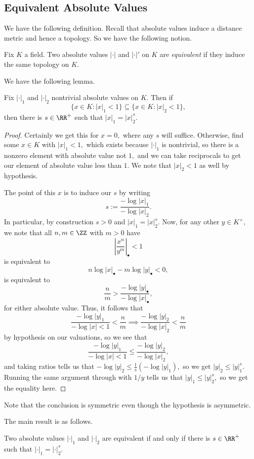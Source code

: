 \documentclass[../notes.tex]{subfiles}
\begin{document}
\subsection{Equivalent Absolute Values}
We have the following definition. Recall that absolute values induce a distance metric and hence a topology. So we have the following notion.
\begin{definition}[Equivalent]
	Fix $K$ a field. Two absolute values $|\cdot|$ and $|\cdot|'$ on $K$ are \textit{equivalent} if they induce the same topology on $K.$
\end{definition}
We have the following lemma.
\begin{lemma} \label{lem:eqabsvals}
	Fix $|\cdot|_1$ and $|\cdot|_2$ nontrivial absolute values on $K.$ Then if
	\[\{x\in K:|x|_1<1\}\subseteq\{x\in K:|x|_2<1\},\]
	then there is $s\in\RR^+$ such that $|x|_1=|x|_2^s.$
\end{lemma}
\begin{proof}
	Certainly we get this for $x=0,$ where any $s$ will suffice. Otherwise, find some $x\in K$ with $|x|_1<1,$ which exists because $|\cdot|_1$ is nontrivial, so there is a nonzero element with absolute value not $1,$ and we can take reciprocals to get our element of absolute value less than $1.$ We note that $|x|_2<1$ as well by hypothesis.

	The point of this $x$ is to induce our $s$ by writing
	\[s:=\frac{-\log|x|_1}{-\log|x|_2}.\]
	In particular, by construction $s>0$ and $|x|_1=|x|_2^s.$ Now, for any other $y\in K^\times,$ we note that all $n,m\in\ZZ$ with $m>0$ have
	\[\left|\frac{x^n}{y^m}\right|_\bullet<1\]
	is equivalent to
	\[n\log|x|_\bullet-m\log|y|_\bullet<0,\]
	is equivalent to
	\[\frac nm>\frac{-\log|y|_\bullet}{-\log|x|_\bullet},\]
	for either absolute value. Thus, it follows that
	\[\frac{-\log|y|_1}{-\log|x|<1}<\frac nm\implies\frac{-\log|y|_2}{-\log|x|_2}<\frac nm\]
	by hypothesis on our valuations, so we see that
	\[\frac{-\log|y|_1}{-\log|x|<1}\le\frac{-\log|y|_2}{-\log|x|_2},\]
	and taking ratios tells us that $-\log|y|_2\le\frac1s(-\log|y|_1),$ so we get $|y|_2\le|y|_1^s.$ Running the same argument through with $1/y$ tells us that $|y|_1\le|y|_2^s,$ so we get the equality here.
\end{proof}
\begin{remark}
	Note that the conclusion is symmetric even though the hypothesis is asymmetric.
\end{remark}
The main result is as follows.
\begin{proposition}
	Two absolute values $|\cdot|_1$ and $|\cdot|_2$ are equivalent if and only if there is $s\in\RR^+$ such that $|\cdot|_1=|\cdot|_2^s.$
\end{proposition}
\end{document}
